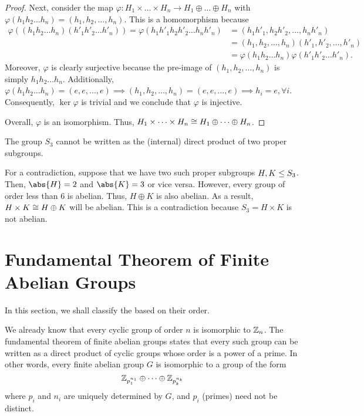 \documentclass[11pt]{penrose}
\begin{document}
\begin{proof}
    Next, consider the map $\varphi : H_{1} \times \dots \times H_{n} \to H_{1} \oplus \dots \oplus H_{n}$ with $\varphi(h_{1} h_{2} \dots h_{n}) = (h_{1}, h_{2}, \dots, h_{n})$. This is a homomorphism because
    \begin{align*}
        \varphi((h_{1} h_{2} \dots h_{n}) (h'_{1} h'_{2} \dots h'_{n}))
        = \varphi(h_{1}h'_{1} h_{2}h'_{2} \dots h_{n}h'_{n})
        &= (h_{1}h'_{1}, h_{2}h'_{2}, \dots, h_{n}h'_{n})\\
        &= (h_{1}, h_{2}, \dots, h_{n}) (h'_{1}, h'_{2}, \dots, h'_{n})\\
        &= \varphi(h_{1} h_{2} \dots h_{n} ) \varphi(h'_{1} h'_{2} \dots h'_{n}).
    \end{align*}
    Moreover, $\varphi$ is clearly surjective because the pre-image of $(h_{1}, h_{2}, \dots, h_{n})$ is simply $h_{1} h_{2} \dots h_{n}$. Additionally, $\varphi(h_{1} h_{2} \dots h_{n}) = (e, e, \dots, e) \implies (h_{1}, h_{2}, \dots, h_{n}) = (e, e, \dots, e) \implies h_{i} = e, \forall i$.
    Consequently, $\ker\varphi$ is trivial and we conclude that $\varphi$ is injective.

    Overall, $\varphi$ is an isomorphism. Thus, $H_{1} \times \dots \times H_{n} \mathrel{\cong} H_{1} \oplus \dots \oplus H_{n}$.
\end{proof}

\begin{negg}
    The group $S_{3}$ cannot be written as the (internal) direct product of two proper subgroups.

    For a contradiction, suppose that we have two such proper subgroups $H, K \mathrel{\leq} S_{3}$. Then, $\abs{H} = 2$ and $\abs{K} = 3$ or vice versa. However, every group of order less than $6$ is abelian. Thus, $H \oplus K$ is also abelian. As a result, $H \times K \mathrel{\cong} H \oplus K$ will be abelian. This is a contradiction because $S_{3} = H \times K$ is not abelian. \eggqed
\end{negg}

\section{Fundamental Theorem of Finite Abelian Groups}
In this section, we shall classify the  based on their order.

We already know that every cyclic group of order $n$ is isomorphic to $\mathbb{Z}_{n}$. The fundamental theorem of finite abelian groups states that every such group can be written as a direct product of cyclic groups whose order is a power of a prime. In other words, every finite abelian group $G$ is isomorphic to a group of the form
\begin{equation*}
    \mathbb{Z}_{p_{1}^{n_{1}}} \oplus \dots \oplus \mathbb{Z}_{p_{k}^{n_{k}}}
\end{equation*}
where $p_{i}$ and $n_{i}$ are uniquely determined by $G$, and $p_{i}$ (primes) need not be distinct.
\end{document}
